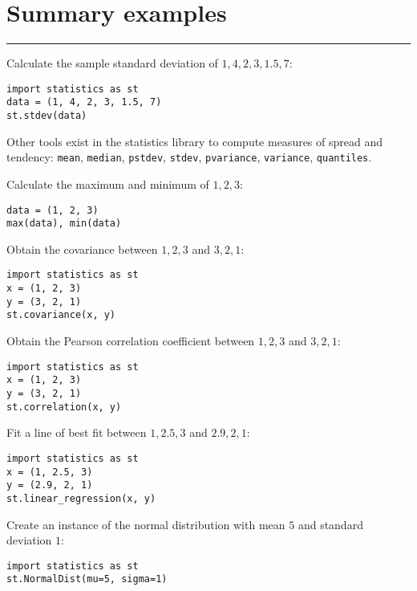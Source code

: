 \documentclass{article}
\begin{document}
\section{Summary examples}
\hrule

\begin{multicols}{2}

    Calculate the sample standard deviation of $1, 4, 2, 3, 1.5, 7$:

        \begin{verbatim}
import statistics as st
data = (1, 4, 2, 3, 1.5, 7)
st.stdev(data)
\end{verbatim}

Other tools exist in the statistics library to compute measures of spread and
tendency: \texttt{mean}, \texttt{median},
    \texttt{pstdev}, \texttt{stdev},
    \texttt{pvariance}, \texttt{variance},
    \texttt{quantiles}.

    Calculate the maximum and minimum of $1, 2, 3$:

        \begin{verbatim}
data = (1, 2, 3)
max(data), min(data)
\end{verbatim}

    Obtain the covariance between $1, 2, 3$ and $3, 2, 1$:

        \begin{verbatim}
import statistics as st
x = (1, 2, 3)
y = (3, 2, 1)
st.covariance(x, y)
\end{verbatim}

    Obtain the Pearson correlation coefficient between $1, 2, 3$ and $3, 2, 1$:

        \begin{verbatim}
import statistics as st
x = (1, 2, 3)
y = (3, 2, 1)
st.correlation(x, y)
\end{verbatim}

    Fit a line of best fit between $1, 2.5, 3$ and $2.9, 2, 1$:

        \begin{verbatim}
import statistics as st
x = (1, 2.5, 3)
y = (2.9, 2, 1)
st.linear_regression(x, y)
\end{verbatim}

    Create an instance of the normal distribution with mean $5$ and standard
    deviation $1$:

        \begin{verbatim}
import statistics as st
st.NormalDist(mu=5, sigma=1)
\end{verbatim}

\end{multicols}
\end{document}
